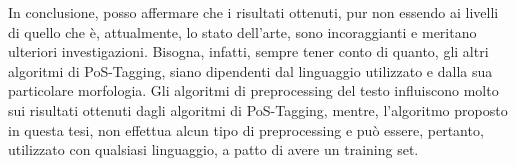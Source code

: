 In conclusione, posso affermare che i risultati ottenuti, pur non essendo ai livelli
di quello che \`e, attualmente, lo stato dell'arte, sono incoraggianti e meritano
ulteriori investigazioni. Bisogna, infatti, sempre tener conto di quanto, gli altri
algoritmi di PoS-Tagging, siano dipendenti dal linguaggio utilizzato e dalla sua
particolare morfologia. Gli algoritmi di preprocessing del testo influiscono molto
sui risultati ottenuti dagli algoritmi di PoS-Tagging, mentre, l'algoritmo proposto
in questa tesi, non effettua alcun tipo di preprocessing e pu\`o essere, pertanto,
utilizzato con qualsiasi linguaggio, a patto di avere un training set.
